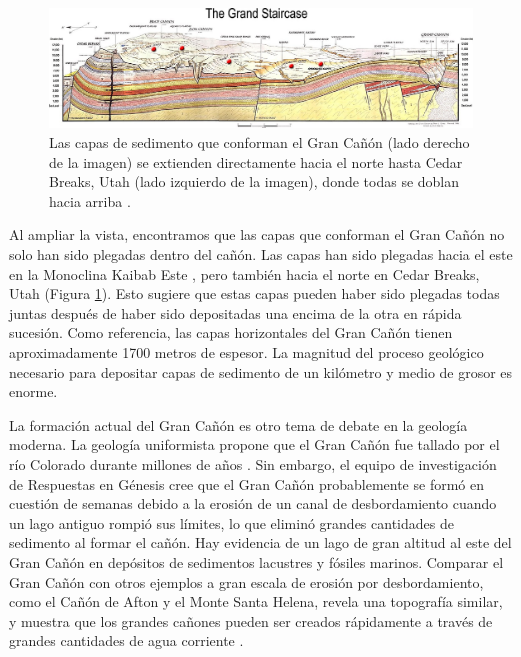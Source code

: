 \documentclass[10pt,twocolumn,letterpaper]{article}
\begin{document}
\begin{figure}
\begin{center}
\includegraphics[width=1\textwidth]{Grand_Staircase-big.jpg}
\end{center}
   \caption{Las capas de sedimento que conforman el Gran Cañón (lado derecho de la imagen) se extienden directamente hacia el norte hasta Cedar Breaks, Utah (lado izquierdo de la imagen), donde todas se doblan hacia arriba \cite{50}.}
\label{fig:4}
\end{figure}

Al ampliar la vista, encontramos que las capas que conforman el Gran Cañón no solo han sido plegadas dentro del cañón. Las capas han sido plegadas hacia el este en la Monoclina Kaibab Este \cite{46}, pero también hacia el norte en Cedar Breaks, Utah (Figura \ref{fig:4}). Esto sugiere que estas capas pueden haber sido plegadas todas juntas después de haber sido depositadas una encima de la otra en rápida sucesión. Como referencia, las capas horizontales del Gran Cañón tienen aproximadamente 1700 metros de espesor. La magnitud del proceso geológico necesario para depositar capas de sedimento de un kilómetro y medio de grosor es enorme.

La formación actual del Gran Cañón es otro tema de debate en la geología moderna. La geología uniformista propone que el Gran Cañón fue tallado por el río Colorado durante millones de años \cite{47}. Sin embargo, el equipo de investigación de Respuestas en Génesis cree que el Gran Cañón probablemente se formó en cuestión de semanas debido a la erosión de un canal de desbordamiento cuando un lago antiguo rompió sus límites, lo que eliminó grandes cantidades de sedimento al formar el cañón. Hay evidencia de un lago de gran altitud al este del Gran Cañón en depósitos de sedimentos lacustres y fósiles marinos. Comparar el Gran Cañón con otros ejemplos a gran escala de erosión por desbordamiento, como el Cañón de Afton y el Monte Santa Helena, revela una topografía similar, y muestra que los grandes cañones pueden ser creados rápidamente a través de grandes cantidades de agua corriente \cite{48}.
\end{document}
